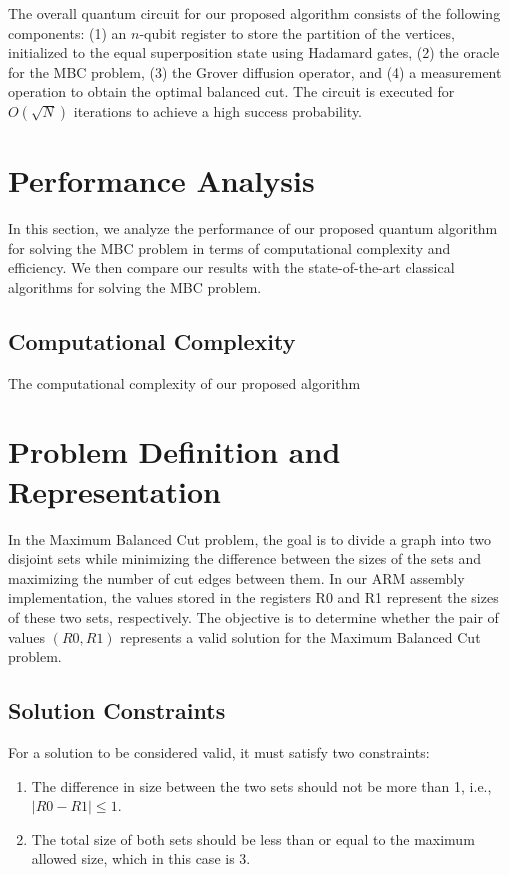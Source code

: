 The overall quantum circuit for our proposed algorithm consists of the following components: (1) an $n$-qubit register to store the partition of the vertices, initialized to the equal superposition state using Hadamard gates, (2) the oracle for the MBC problem, (3) the Grover diffusion operator, and (4) a measurement operation to obtain the optimal balanced cut. The circuit is executed for $O(\sqrt{N})$ iterations to achieve a high success probability.

\section{Performance Analysis}
\label{sec:analysis}

In this section, we analyze the performance of our proposed quantum algorithm for solving the MBC problem in terms of computational complexity and efficiency. We then compare our results with the state-of-the-art classical algorithms for solving the MBC problem.

\subsection{Computational Complexity}

The computational complexity of our proposed algorithm

\section{Problem Definition and Representation}

In the Maximum Balanced Cut problem, the goal is to divide a graph into two disjoint sets while minimizing the difference between the sizes of the sets and maximizing the number of cut edges between them. In our ARM assembly implementation, the values stored in the registers R0 and R1 represent the sizes of these two sets, respectively. The objective is to determine whether the pair of values $(R0, R1)$ represents a valid solution for the Maximum Balanced Cut problem.

\subsection{Solution Constraints}

For a solution to be considered valid, it must satisfy two constraints:

\begin{enumerate}
    \item The difference in size between the two sets should not be more than 1, i.e., $|R0-R1| \leq 1$.
    \item The total size of both sets should be less than or equal to the maximum allowed size, which in this case is 3.
\end{enumerate}

